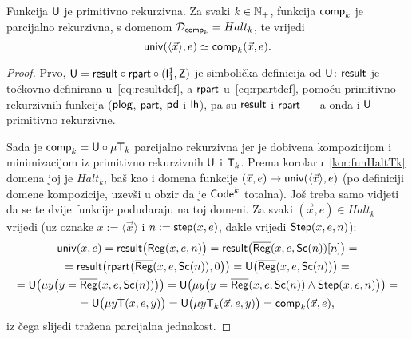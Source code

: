 \begin{propozicija}\label{prop:compspec}
Funkcija $\mathsf U$ je primitivno rekurzivna. Za svaki $k\in{\mathbb N}_+$, funkcija $\mathsf{comp}_k$ je parcijalno rekurzivna, s domenom $\mathcal D_{\mathsf{comp}_k}=Halt_k$, te vrijedi \begin{equation}\label{eq:comp=univ}
    \mathsf{univ}(\langle\vec x\rangle,e)\simeq\mathsf{comp}_k(\vec x,e)\text.
\end{equation}
\end{propozicija}
\begin{proof}
Prvo, $\mathsf U=\mathsf{result}\circ\mathsf{rpart}\circ(\mathsf I_1^1,\mathsf Z)$ je simbolička definicija od $\mathsf U$: $\mathsf{result}$ je točkovno definirana u~\eqref{eq:resultdef}, a $\mathsf{rpart}$ u~\eqref{eq:rpartdef}, pomoću primitivno rekurzivnih funkcija ($\mathsf{plog}$, $\mathsf{part}$, $\mathsf{pd}$ i $\mathsf{lh}$), pa su $\mathsf{result}$ i $\mathsf{rpart}$ --- a onda i $\mathsf U$ --- primitivno rekurzivne.

Sada je $\mathsf{comp}_k=\mathsf U\circ\mu\mathsf T_k$ parcijalno rekurzivna jer je dobivena kompozicijom i minimizacijom iz primitivno rekurzivnih $\mathsf U$ i $\mathsf T_k$. Prema korolaru~\ref{kor:funHaltTk} domena joj je $Halt_k$, baš kao i domena funkcije $(\vec x,e)\mapsto\mathsf{univ}(\langle\vec x\rangle,e)$ (po definiciji domene kompozicije, uzevši u obzir da je $\mathsf{Code}^k$ totalna). Još treba samo vidjeti da se te dvije funkcije podudaraju na toj domeni. Za svaki $(\vec x,e)\in Halt_k$ vrijedi (uz oznake $x:=\langle\vec x\rangle$ i $n:=\mathsf{step}(x,e)$, dakle vrijedi $\mathsf{Step}(x,e,n)$):
\begin{multline}
    \mathsf{univ}(x,e)=
    \mathsf{result}\bigl(\mathsf{Reg}(x,e,n)\bigr)=
    \mathsf{result}\bigl(\overline{\mathsf{Reg}}(x,e,\mathsf{Sc}(n))[n]\bigr)=\\
    =
    \mathsf{result}\bigl(\mathsf{rpart}\bigl(\overline{\mathsf{Reg}}(x,e,\mathsf{Sc}(n)),0\bigr)\bigr)=
    \mathsf U\bigl(\overline{\mathsf{Reg}}(x,e,\mathsf{Sc}(n))\bigr)
    =\\
    =\mathsf U\bigl(\mu y\bigl(y=\overline{\mathsf{Reg}}(x,e,\mathsf{Sc}(n))\bigr)\bigr)=
    \mathsf U\bigl(\mu y\bigl(y=\overline{\mathsf{Reg}}(x,e,\mathsf{Sc}(n))\land\mathsf{Step}(x,e,n)\bigr)\bigr)=\\
    =\mathsf U\bigl(\mu y\mathsf{\dot T}(x,e,y)\bigr)=
    \mathsf U\bigl(\mu y\mathsf T_k(\vec x,e,y)\bigr)=
    \mathsf{comp}_k(\vec x,e)\text,
\end{multline}
iz čega slijedi tražena parcijalna jednakost.
\end{proof}

